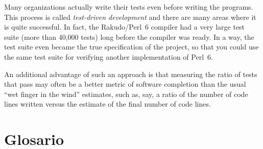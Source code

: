 Many organizations actually write their tests even before 
writing the programs. This process is called 
\emph{test-driven development} and there are many areas where 
it is quite successful. In fact, the Rakudo/Perl~6 compiler 
had a very large test suite (more than 40,000 tests) long 
before the compiler was ready. In a way, the test suite 
even became the true specification of the project, so that 
you could use the same test suite for verifying another 
implementation of Perl~6.

An additional advantage of 
such an approach is that measuring the ratio of tests that 
pass may often be a better metric of software completion than  
the usual ``wet finger in the wind'' estimates, such as, say, 
a ratio of the number of code lines written versus the estimate 
of the final number of code lines.

\section{Glosario}

